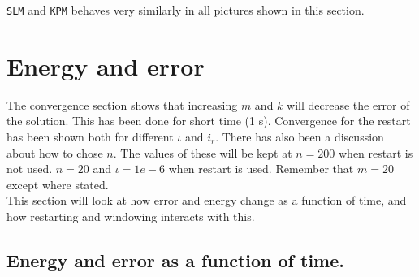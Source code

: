 \texttt{SLM} and \texttt{KPM} behaves very similarly in all pictures shown in this section. \\

\section{ Energy and error }%
\label{sec:resultconsterergy}
The convergence section shows that increasing $m$ and $k$ will decrease the error of the solution. This has been done for short time (1 s). Convergence for the restart has been shown both for different $\iota$ and $i_r$. There has also been a discussion about how to chose $n$. The values of these will be kept at $n = 200$ when restart is not used. $n = 20$ and $\iota = 1e-6$ when restart is used. Remember that $m = 20$ except where stated. \\This section will look at how error and energy change as a function of time, and how restarting and windowing interacts with this.


\subsection{ Energy and error as a function of time. } %


